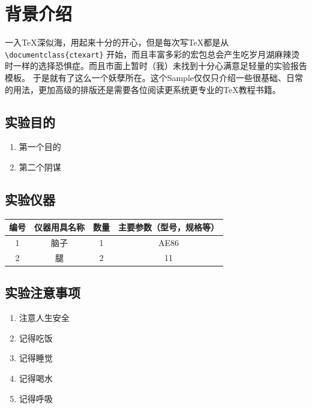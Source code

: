 \documentclass[no-math,zihao = -4]{ctexart} %
\begin{document}
\kaitou %

\section{背景介绍}
    一入\TeX 深似海，用起来十分的开心，但是每次写\TeX 都是从
    \verb|\documentclass{ctexart}|
    开始，而且丰富多彩的宏包总会产生吃岁月湖麻辣烫时一样的选择恐惧症。而且市面上暂时（我）未找到十分心满意足轻量的实验报告模板。
    于是就有了这么一个妖孽所在。这个Sample仅仅只介绍一些很基础、日常的用法，更加高级的排版还是需要各位阅读更系统更专业的\TeX 教程书籍。

    \subsection{实验目的}
        \begin{enumerate}
            \item 第一个目的
            \item 第二个阴谋
        \end{enumerate}

    \subsection{实验仪器}
        \begin{center}
            \begin{tabular}[c]{cccc}
                \toprule
                    编号   &仪器用具名称 &  数量   &主要参数（型号，规格等）\\ 
                \midrule
                    1    & 脑子   & 1 & AE86  \\ 
                    2    & 腿  & 2 & 11 \\ 
                \bottomrule
            \end{tabular}
            \label{tab:实验用具}
        \end{center}

    \subsection{实验注意事项}
        \begin{enumerate}
            \item 注意人生安全
            \item 记得吃饭
            \item 记得睡觉
            \item 记得喝水
            \item 记得呼吸
        \end{enumerate}
\end{document}
